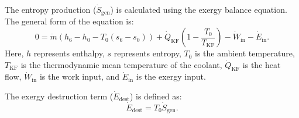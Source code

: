 The entropy production (\( \dot{S}_{\text{gen}} \)) is calculated using the exergy balance equation. The general form of the equation is:  
\[
0 = \dot{m} \left( h_6 - h_0 - T_0 (s_6 - s_0) \right) + \dot{Q}_{\text{KF}} \left( 1 - \frac{T_0}{T_{\text{KF}}} \right) - \dot{W}_{\text{in}} - \dot{E}_{\text{in}}.
\]  
Here, \( h \) represents enthalpy, \( s \) represents entropy, \( T_0 \) is the ambient temperature, \( T_{\text{KF}} \) is the thermodynamic mean temperature of the coolant, \( \dot{Q}_{\text{KF}} \) is the heat flow, \( \dot{W}_{\text{in}} \) is the work input, and \( \dot{E}_{\text{in}} \) is the exergy input.  

The exergy destruction term (\( \dot{E}_{\text{dest}} \)) is defined as:  
\[
\dot{E}_{\text{dest}} = T_0 \dot{S}_{\text{gen}}.
\]
